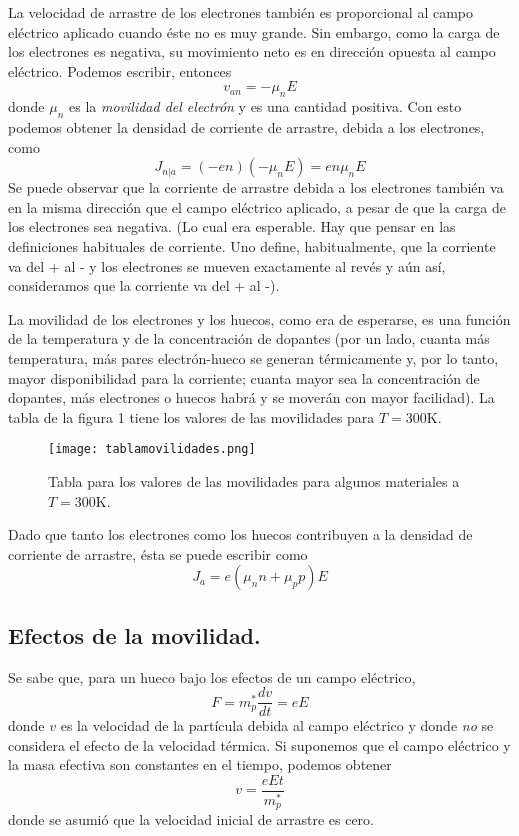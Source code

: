 \documentclass[12pt,a4paper]{article}
\begin{document}
La velocidad de arrastre de los electrones también es proporcional al campo eléctrico aplicado cuando éste no es muy grande. Sin embargo, como la carga de los electrones es negativa, su movimiento neto es en dirección opuesta al campo eléctrico. Podemos escribir, entonces
\[ v_{an}=-\mu _{n} E \]
donde $\mu _{n}$ es la \emph{movilidad del electrón} y es una cantidad positiva. Con esto podemos obtener la densidad de corriente de arrastre, debida a los electrones, como
\[ J_{n|a}=(-en)(-\mu _{n}E) = en\mu _{n}E \]
Se puede observar que la corriente de arrastre debida a los electrones también va en la misma dirección que el campo eléctrico aplicado, a pesar de que la carga de los electrones sea negativa. (Lo cual era esperable. Hay que pensar en las definiciones habituales de corriente. Uno define, habitualmente, que la corriente va del + al - y los electrones se mueven exactamente al revés y aún así, consideramos que la corriente va del + al -).

La movilidad de los electrones y los huecos, como era de esperarse, es una función de la temperatura y de la concentración de dopantes (por un lado, cuanta más temperatura, más pares electrón-hueco se generan térmicamente y, por lo tanto, mayor disponibilidad para la corriente; cuanta mayor sea la concentración de dopantes, más electrones o huecos habrá y se moverán con mayor facilidad). La tabla de la figura 1 tiene los valores de las movilidades para $T=300$K.

\begin{figure}[ht!]
\begin{center}
\texttt{[image: tablamovilidades.png]}
\caption{Tabla para los valores de las movilidades para algunos materiales a $T=300$K.}
\end{center}
\end{figure}

Dado que tanto los electrones como los huecos contribuyen a la densidad de corriente de arrastre, ésta se puede escribir como
\[ J_{a} = e(\mu _{n}n + \mu _{p}p) E \]

\subsection{Efectos de la movilidad.}

Se sabe que, para un hueco bajo los efectos de un campo eléctrico,
\[ F = m_{p}^{\ast} \frac{dv}{dt} = eE \]
donde $v$ es la velocidad de la partícula debida al campo eléctrico y donde \emph{no} se considera el efecto de la velocidad térmica. Si suponemos que el campo eléctrico y la masa efectiva son constantes en el tiempo, podemos obtener
\[ v=\frac{eEt}{m_{p}^{\ast}}\]
donde se asumió que la velocidad inicial de arrastre es cero.
\end{document}
